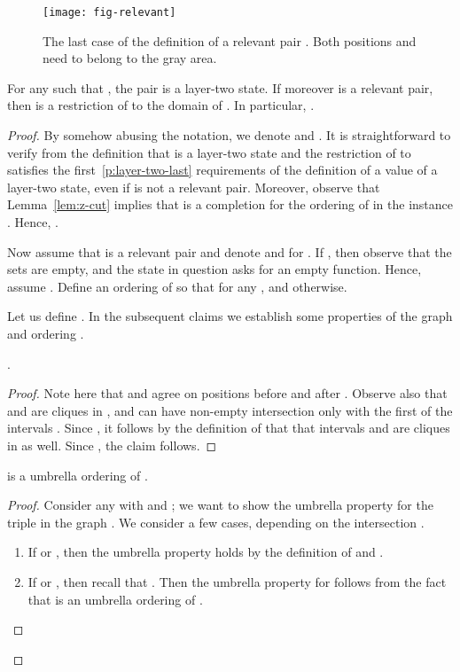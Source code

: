 \begin{figure}
\centering
\texttt{[image: fig-relevant]}
\caption{The last case of the definition of a relevant pair .
  Both positions  and  need to belong to the gray area.}
\label{fig:relevant}
\end{figure}

\begin{lemma}\label{lem:layer-two-ord}
For any  such that , the pair  is a layer-two state.
If moreover  is a relevant pair, then  is a restriction of  to the domain of .
In particular, .
\end{lemma}
\begin{proof}
By somehow abusing the notation, we denote  and . It is straightforward to verify from the definition that  is a layer-two state
and the restriction of  to  satisfies the first~\ref{p:layer-two-last} requirements
of the definition of a value of a layer-two state, even if  is not a relevant pair.
Moreover, observe that Lemma~\ref{lem:z-cut} implies that  is a completion for the ordering
 of  in the instance . Hence, .

Now assume that  is a relevant pair and denote  and 
for .
If , then observe that the sets  are empty, and the state in question asks for an empty function. Hence, assume .
Define an ordering  of  so that  for any , and  otherwise.

Let us define . 
In the subsequent claims we establish some properties of the graph  and ordering .
\begin{claim}\label{cl:layer-two:margins}
.
\end{claim}
\begin{proof}
Note here that  and  agree on positions before  and after . Observe also that  and  are cliques in , and  can have non-empty intersection only with the first of the intervals .
Since , it follows by the definition of  that that intervals  and  are cliques in  as well. Since , the claim follows.
\cqed\end{proof}

\begin{claim}\label{cl:layer-two:umbrella}
 is a umbrella ordering of .
\end{claim}
\begin{proof}
Consider any  with  and
; we want to show the umbrella property for the triple
 in the graph . We consider a few cases, depending on the intersection .
\begin{enumerate}
\item If  or , then the umbrella property holds by the definition of  and .
\item If  or , then recall that . Then the umbrella property for  follows from the fact that  is an umbrella ordering of .


\end{enumerate}
\end{proof}
\end{proof}
